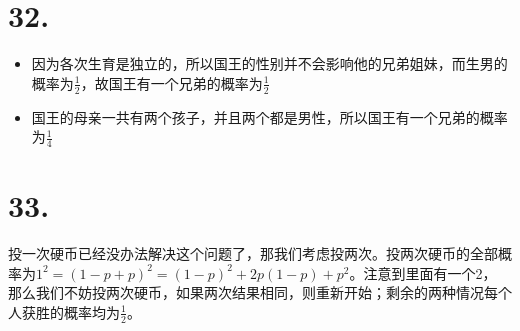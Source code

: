 \documentclass[UTF8]{report}
\begin{document}
    \section*{32.}
        \begin{itemize}
            \item 因为各次生育是独立的，所以国王的性别并不会影响他的兄弟姐妹，而生男的概率为$\frac{1}{2}$，故国王有一个兄弟的概率为$\frac{1}{2}$
            \item 国王的母亲一共有两个孩子，并且两个都是男性，所以国王有一个兄弟的概率为$\frac{1}{4}$
        \end{itemize}
    \section*{33.}
        投一次硬币已经没办法解决这个问题了，那我们考虑投两次。投两次硬币的全部概率为$1^2 = (1 - p + p)^2 = (1 - p)^2 + 2p(1 - p) + p^2$。注意到里面有一个2，
        那么我们不妨投两次硬币，如果两次结果相同，则重新开始；剩余的两种情况每个人获胜的概率均为$\frac{1}{2}$。
\end{document}
